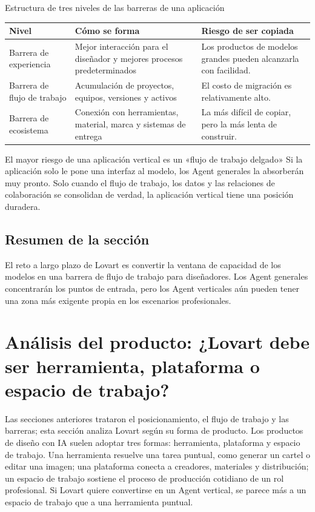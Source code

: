 \documentclass[a4paper]{article}
\begin{document}
\begin{knowledgebox}{Estructura de tres niveles de las barreras de una aplicación}
\begin{tabularx}{\textwidth}{p{}p{}X}
\toprule
Nivel & Cómo se forma & Riesgo de ser copiada \\
\midrule
Barrera de experiencia & Mejor interacción para el diseñador y mejores procesos predeterminados & Los productos de modelos grandes pueden alcanzarla con facilidad. \\
Barrera de flujo de trabajo & Acumulación de proyectos, equipos, versiones y activos & El costo de migración es relativamente alto. \\
Barrera de ecosistema & Conexión con herramientas, material, marca y sistemas de entrega & La más difícil de copiar, pero la más lenta de construir. \\
\bottomrule
\end{tabularx}
\end{knowledgebox}

\begin{warningbox}{El mayor riesgo de una aplicación vertical es un «flujo de trabajo delgado»}
Si la aplicación solo le pone una interfaz al modelo, los Agent generales la absorberán muy pronto. Solo cuando el flujo de trabajo, los datos y las relaciones de colaboración se consolidan de verdad, la aplicación vertical tiene una posición duradera.
\end{warningbox}

\subsection{Resumen de la sección}

El reto a largo plazo de Lovart es convertir la ventana de capacidad de los modelos en una barrera de flujo de trabajo para diseñadores. Los Agent generales concentrarán los puntos de entrada, pero los Agent verticales aún pueden tener una zona más exigente propia en los escenarios profesionales.
\section{Análisis del producto: ¿Lovart debe ser herramienta, plataforma o espacio de trabajo?}

Las secciones anteriores trataron el posicionamiento, el flujo de trabajo y las barreras; esta sección analiza Lovart según su forma de producto. Los productos de diseño con IA suelen adoptar tres formas: herramienta, plataforma y espacio de trabajo. Una herramienta resuelve una tarea puntual, como generar un cartel o editar una imagen; una plataforma conecta a creadores, materiales y distribución; un espacio de trabajo sostiene el proceso de producción cotidiano de un rol profesional. Si Lovart quiere convertirse en un Agent vertical, se parece más a un espacio de trabajo que a una herramienta puntual.
\end{document}
